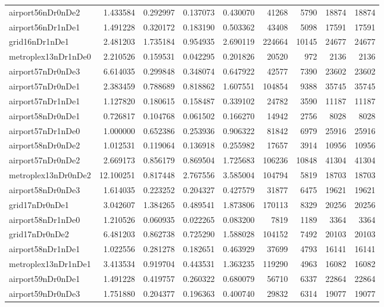 \begin{longtable}{|l|r|r|r|r|r|r|r|r|}
airport56nDr0nDe2 & 1.433584 & 0.292997 & 0.137073 & 0.430070 & 41268 & 5790 & 18874 & 18874 \\
airport56nDr1nDe1 & 1.491228 & 0.320172 & 0.183190 & 0.503362 & 43408 & 5098 & 17591 & 17591 \\
grid16nDr1nDe1 & 2.481203 & 1.735184 & 0.954935 & 2.690119 & 224664 & 10145 & 24677 & 24677 \\
metroplex13nDr1nDe0 & 2.210526 & 0.159531 & 0.042295 & 0.201826 & 20520 & 972 & 2136 & 2136 \\
airport57nDr0nDe3 & 6.614035 & 0.299848 & 0.348074 & 0.647922 & 42577 & 7390 & 23602 & 23602 \\
airport57nDr0nDe1 & 2.383459 & 0.788689 & 0.818862 & 1.607551 & 104854 & 9388 & 35745 & 35745 \\
airport57nDr1nDe1 & 1.127820 & 0.180615 & 0.158487 & 0.339102 & 24782 & 3590 & 11187 & 11187 \\
airport58nDr0nDe1 & 0.726817 & 0.104768 & 0.061502 & 0.166270 & 14942 & 2756 & 8028 & 8028 \\
airport57nDr1nDe0 & 1.000000 & 0.652386 & 0.253936 & 0.906322 & 81842 & 6979 & 25916 & 25916 \\
airport58nDr0nDe2 & 1.012531 & 0.119064 & 0.136918 & 0.255982 & 17657 & 3914 & 10956 & 10956 \\
airport57nDr0nDe2 & 2.669173 & 0.856179 & 0.869504 & 1.725683 & 106236 & 10848 & 41304 & 41304 \\
metroplex13nDr0nDe2 & 12.100251 & 0.817448 & 2.767556 & 3.585004 & 104794 & 5819 & 18703 & 18703 \\
airport58nDr0nDe3 & 1.614035 & 0.223252 & 0.204327 & 0.427579 & 31877 & 6475 & 19621 & 19621 \\
grid17nDr0nDe1 & 3.042607 & 1.384265 & 0.489541 & 1.873806 & 170113 & 8329 & 20256 & 20256 \\
airport58nDr1nDe0 & 1.210526 & 0.060935 & 0.022265 & 0.083200 & 7819 & 1189 & 3364 & 3364 \\
grid17nDr0nDe2 & 6.481203 & 0.862738 & 0.725290 & 1.588028 & 104152 & 7492 & 20103 & 20103 \\
airport58nDr1nDe1 & 1.022556 & 0.281278 & 0.182651 & 0.463929 & 37699 & 4793 & 16141 & 16141 \\
metroplex13nDr1nDe1 & 3.413534 & 0.919704 & 0.443531 & 1.363235 & 119290 & 4963 & 16082 & 16082 \\
airport59nDr0nDe1 & 1.491228 & 0.419757 & 0.260322 & 0.680079 & 56710 & 6337 & 22864 & 22864 \\
airport59nDr0nDe3 & 1.751880 & 0.204377 & 0.196363 & 0.400740 & 29832 & 6314 & 19077 & 19077 \\

\end{longtable}
